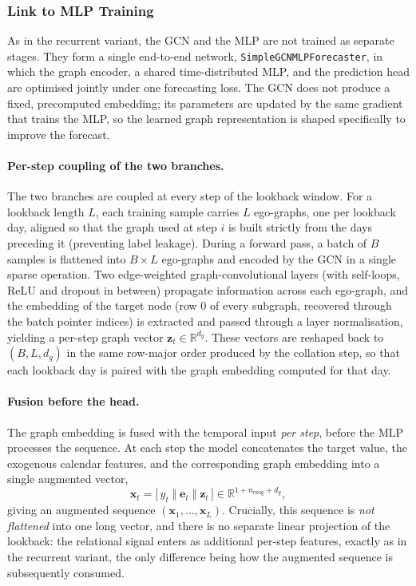 \subsubsection{Link to MLP Training}
\label{sec:gcn_mlp_link}

As in the recurrent variant, the GCN and the MLP are not trained as separate
stages. They form a single end-to-end network, \texttt{SimpleGCNMLPForecaster},
in which the graph encoder, a shared time-distributed MLP, and the prediction
head are optimised jointly under one forecasting loss. The GCN does not produce
a fixed, precomputed embedding; its parameters are updated by the same gradient
that trains the MLP, so the learned graph representation is shaped specifically
to improve the forecast.

\paragraph{Per-step coupling of the two branches.}
The two branches are coupled at every step of the lookback window. For a
lookback length $L$, each training sample carries $L$ ego-graphs, one per
lookback day, aligned so that the graph used at step $i$ is built strictly from
the days preceding it (preventing label leakage). During a forward pass, a
batch of $B$ samples is flattened into $B \times L$ ego-graphs and encoded by
the GCN in a single sparse operation. Two edge-weighted graph-convolutional
layers (with self-loops, ReLU and dropout in between) propagate information
across each ego-graph, and the embedding of the target node (row $0$ of every
subgraph, recovered through the batch pointer indices) is extracted and passed
through a layer normalisation, yielding a per-step graph vector
$\mathbf{z}_t \in \mathbb{R}^{d_g}$. These vectors are reshaped back to
$(B, L, d_g)$ in the same row-major order produced by the collation step, so
that each lookback day is paired with the graph embedding computed for that day.

\paragraph{Fusion before the head.}
The graph embedding is fused with the temporal input \emph{per step}, before
the MLP processes the sequence. At each step the model concatenates the target
value, the exogenous calendar features, and the corresponding graph embedding
into a single augmented vector,
\[
\mathbf{x}_t = \big[\, y_t \;\Vert\; \mathbf{e}_t \;\Vert\; \mathbf{z}_t \,\big]
\in \mathbb{R}^{1 + n_\text{exog} + d_g},
\]
giving an augmented sequence $(\mathbf{x}_1, \dots, \mathbf{x}_L)$. Crucially,
this sequence is \emph{not flattened} into one long vector, and there is no
separate linear projection of the lookback: the relational signal enters as
additional per-step features, exactly as in the recurrent variant, the only
difference being how the augmented sequence is subsequently consumed.

